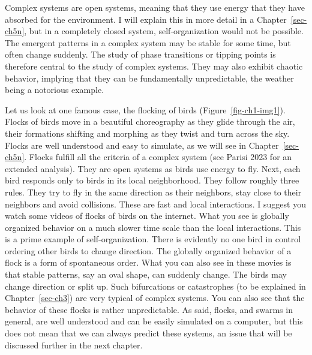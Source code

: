 \documentclass[
  a4paper,
  DIV=11,
  numbers=noendperiod,
  oneside]{scrreprt}
\begin{document}
Complex systems are open systems, meaning that they use energy that they
have absorbed for the environment. I will explain this in more detail in
a Chapter~\ref{sec-ch5n}, but in a completely closed system,
self-organization would not be possible. The emergent patterns in a
complex system may be stable for some time, but often change suddenly.
The study of phase transitions or tipping points is therefore central to
the study of complex systems. They may also exhibit chaotic behavior,
implying that they can be fundamentally unpredictable, the weather being
a notorious example.

Let us look at one famous case, the flocking of birds
(Figure~\ref{fig-ch1-img1}). Flocks of birds move in a beautiful
choreography as they glide through the air, their formations shifting
and morphing as they twist and turn across the sky. Flocks are well
understood and easy to simulate, as we will see in
Chapter~\ref{sec-ch5n}. Flocks fulfill all the criteria of a complex
system (see Parisi 2023 for an extended analysis). They are open systems
as birds use energy to fly. Next, each bird responds only to birds in
its local neighborhood. They follow roughly three rules. They try to fly
in the same direction as their neighbors, stay close to their neighbors
and avoid collisions. These are fast and local interactions. I suggest
you watch some videos of flocks of birds on the internet. What you see
is globally organized behavior on a much slower time scale than the
local interactions. This is a prime example of self-organization. There
is evidently no one bird in control ordering other birds to change
direction. The globally organized behavior of a flock is a form of
spontaneous order. What you can also see in these movies is that stable
patterns, say an oval shape, can suddenly change. The birds may change
direction or split up. Such bifurcations or catastrophes (to be
explained in Chapter~\ref{sec-ch3}) are very typical of complex systems.
You can also see that the behavior of these flocks is rather
unpredictable. As said, flocks, and swarms in general, are well
understood and can be easily simulated on a computer, but this does not
mean that we can always predict these systems, an issue that will be
discussed further in the next chapter.
\end{document}
